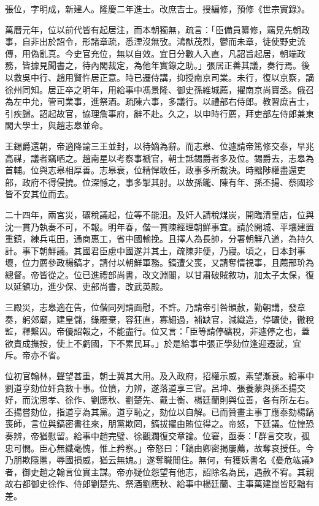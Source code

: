 \begin{pinyinscope}
張位，字明成，新建人。隆慶二年進士。改庶吉士。授編修，預修《世宗實錄》。

萬曆元年，位以前代皆有起居注，而本朝獨無，疏言：「臣備員纂修，竊見先朝政事，自非出於詔令，形諸章疏，悉湮沒無攷。鴻猷茂烈，鬱而未章，徒使野史流傳，用偽亂真。今史官充位，無以自效。宜日分數人入直，凡詔旨起居，朝端政務，皆據見聞書之，待內閣裁定，為他年實錄之助。」張居正善其議，奏行焉。後以救吳中行、趙用賢忤居正意。時已遷侍講，抑授南京司業。未行，復以京察，謫徐州同知。居正卒之明年，用給事中馮景隆、御史孫維城薦，擢南京尚寶丞。俄召為左中允，管司業事，進祭酒。疏陳六事，多議行。以禮部右侍郎。教習庶吉士，引疾歸。詔起故官，協理詹事府，辭不赴。久之，以申時行薦，拜吏部左侍郎兼東閣大學士，與趙志皋並命。

王錫爵還朝，帝適降諭三王並封，以待嫡為辭。而志皋、位遽請帝篤修交泰，早兆高禖，議者竊哂之。趙南星以考察事褫官，朝士詆錫爵者多及位。錫爵去，志皋為首輔。位與志皋相厚善。志皋衰，位精悍敢任，政事多所裁決。時黜陟權盡還吏部，政府不得侵撓。位深憾之，事多掣其肘。以故孫鑨、陳有年、孫丕揚、蔡國珍皆不安其位而去。

二十四年，兩宮災，礦稅議起，位等不能沮。及奸人請稅煤炭，開臨清皇店，位與沈一貫乃執奏不可，不報。明年春，偕一貫陳經理朝鮮事宜。請於開城、平壤建置重鎮，練兵屯田，通商惠工，省中國輸挽。且擇人為長帥，分署朝鮮八道，為持久計。事下朝鮮議。其國君臣慮中國遂并其土，疏陳非便，乃寢。頃之，日本封事壞，位力薦參政楊鎬才，請付以朝鮮軍務。鎬遭父喪，又請奪情視事，且薦邢玠為總督。帝皆從之。位已進禮部尚書，改文淵閣，以甘肅破賊敘功，加太子太保，復以延鎮功，進少保、吏部尚書，改武英殿。

三殿災，志皋適在告，位偕同列請面慰，不許。乃請帝引咎頒赦，勤朝講，發章奏，躬郊廟，建皇儲，錄廢棄，容狂直，寡細過，補缺官，減織造，停礦使，徹稅監，釋繫囚。帝優詔報之，不能盡行。位又言：「臣等請停礦稅，非遽停之也，蓋欲責成撫按，使上不虧國，下不累民耳。」於是給事中張正學劾位逢迎遷就，宜斥。帝亦不省。

位初官翰林，聲望甚重，朝士冀其大用。及入政府，招權示威，素望漸衰。給事中劉道亨劾位奸貪數十事。位憤，力辨，遂落道享三官。呂坤、張養蒙與孫丕揚交好，而沈思孝、徐作、劉應秋、劉楚先、戴士衡、楊廷蘭則與位善，各有所左右。丕揚嘗劾位，指道亨為其黨。道亨恥之，劾位以自解。已而贊畫主事丁應泰劾楊鎬喪師，言位與鎬密書往來，朋黨欺罔，鎬拔擢由賄位得之。帝怒，下廷議。位惶恐奏辨，帝猶慰留。給事中趙完璧、徐觀瀾復交章論。位窘，亟奏：「群言交攻，孤忠可憫。臣心無纖毫愧，惟上矜察。」帝怒曰：「鎬由卿密揭屢薦，故奪哀授任。今乃朋欺隱慝，辱國損威，猶云無媿。」遂奪職閒住。無何，有獲妖書名《憂危竑議》者，御史趙之翰言位實主謀。帝亦疑位怨望有他志，詔除名為民，遇赦不宥。其親故右都御史徐作、侍郎劉楚先、祭酒劉應秋、給事中楊廷蘭、主事萬建崑皆貶黜有差。


\end{pinyinscope}
